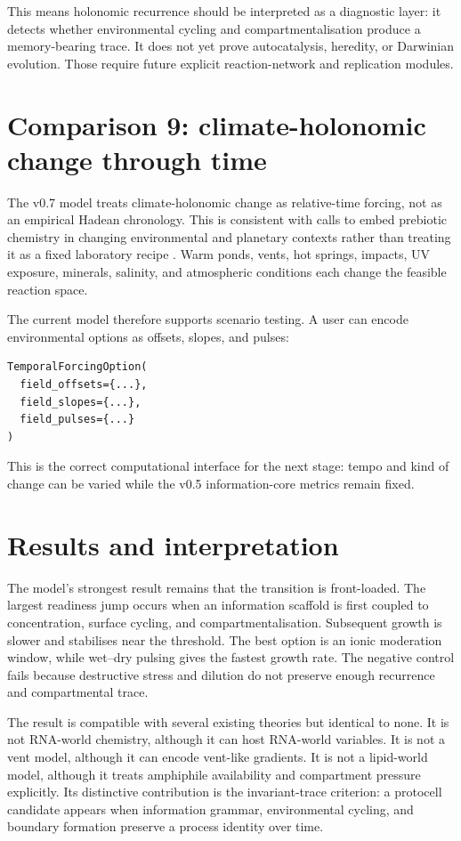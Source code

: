 \documentclass[11pt]{article}
\begin{document}
This means holonomic recurrence should be interpreted as a diagnostic layer: it detects whether environmental cycling and compartmentalisation produce a memory-bearing trace. It does not yet prove autocatalysis, heredity, or Darwinian evolution. Those require future explicit reaction-network and replication modules.

\section{Comparison 9: climate-holonomic change through time}
The v0.7 model treats climate-holonomic change as relative-time forcing, not as an empirical Hadean chronology. This is consistent with calls to embed prebiotic chemistry in changing environmental and planetary contexts rather than treating it as a fixed laboratory recipe \cite{Lyons2020Environments}. Warm ponds, vents, hot springs, impacts, UV exposure, minerals, salinity, and atmospheric conditions each change the feasible reaction space.

The current model therefore supports scenario testing. A user can encode environmental options as offsets, slopes, and pulses:
\begin{verbatim}
TemporalForcingOption(
  field_offsets={...},
  field_slopes={...},
  field_pulses={...}
)
\end{verbatim}
This is the correct computational interface for the next stage: tempo and kind of change can be varied while the v0.5 information-core metrics remain fixed.

\section{Results and interpretation}
The model's strongest result remains that the transition is front-loaded. The largest readiness jump occurs when an information scaffold is first coupled to concentration, surface cycling, and compartmentalisation. Subsequent growth is slower and stabilises near the threshold. The best option is an ionic moderation window, while wet--dry pulsing gives the fastest growth rate. The negative control fails because destructive stress and dilution do not preserve enough recurrence and compartmental trace.

The result is compatible with several existing theories but identical to none. It is not RNA-world chemistry, although it can host RNA-world variables. It is not a vent model, although it can encode vent-like gradients. It is not a lipid-world model, although it treats amphiphile availability and compartment pressure explicitly. Its distinctive contribution is the invariant-trace criterion: a protocell candidate appears when information grammar, environmental cycling, and boundary formation preserve a process identity over time.
\end{document}
